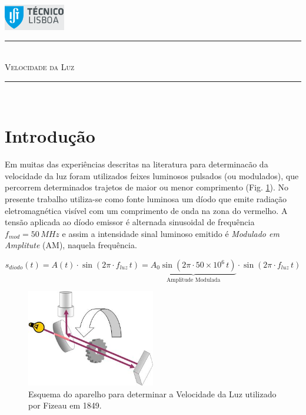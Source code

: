 \documentclass[a4paper,12pt]{article}      %
\author{Prof. Bernardo B. Carvalho}
\date{ Outubro 2012}
\newcommand{\HRule}{\rule{\linewidth}{0.5mm}}
\begin{document}
 

	\includegraphics[width=0.2\textwidth]{../logo-ist}%

	\HRule \\[0.5cm]
	{ \huge \sf  \textsc{Velocidade da Luz} }\\[0.4cm] %
	\HRule \\%


\section{\sf Introdução}
Em muitas das experiências descritas na literatura para
determinacão da velocidade da luz foram utilizados feixes luminosos
pulsados (ou modulados), que percorrem determinados trajetos de maior ou menor
comprimento (Fig. \ref{fig:Fizeau}). 
No presente trabalho utiliza-se como fonte luminosa um díodo que
emite radiação eletromagnética visível com um comprimento de onda na
zona do vermelho. A tensão aplicada ao díodo emissor é alternada
sinusoidal de frequência $f_{mod}=50\,MHz$ e  assim a intensidade sinal luminoso
 emitido é \emph{Modulado em Amplitute} (AM), naquela frequência. 

\begin{equation*}
	\label{eq:f_am}
		s_{diodo}(t) = A(t) \cdot \sin ( 2\pi \cdot f_{luz} \, t) = \underbrace{A_0 \sin ( 2\pi \cdot 50\times 10^6 \, t)}_\text{Amplitude Modulada} \cdot \sin ( 2\pi \cdot f_{luz} \, t)
\end{equation*}

\begin{figure}
	[ht!b]  \centering 
	\includegraphics[width=0.5\textwidth]{Fizeau}
	\caption{Esquema do aparelho para determinar a Velocidade da Luz utilizado por Fizeau em 1849. \label{fig:Fizeau}} 
\end{figure}
\end{document}
